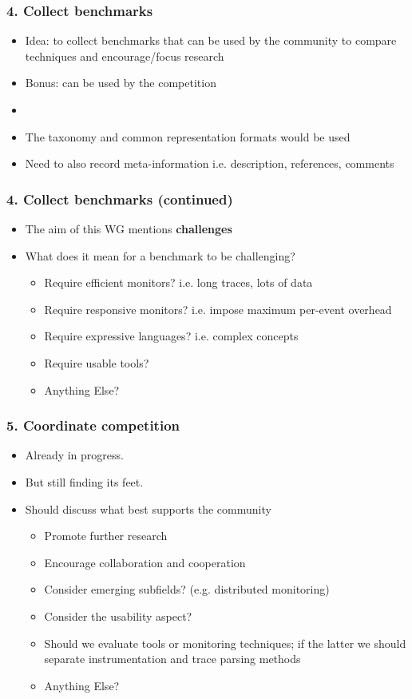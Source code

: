 \documentclass{beamer}
\newcommand{\addhere}{{\color{red} Anything Else?}}
\begin{document}
\begin{frame}
\frametitle{4. Collect benchmarks}
\begin{itemize}
	\item Idea: to collect benchmarks that can be used by the community to compare techniques and encourage/focus research
	\item Bonus: can be used by the competition
	\item[]
	\item The taxonomy and common representation formats would be used
	\item Need to also record meta-information i.e. description, references, comments
\end{itemize}
\end{frame}

\begin{frame}
\frametitle{4. Collect benchmarks (continued)}
\begin{itemize}
	\item The aim of this WG mentions {\bf challenges}
	\item What does it mean for a benchmark to be challenging?
	\begin{itemize}
		\item Require efficient monitors? i.e. long traces, lots of data
		\item Require responsive monitors? i.e. impose maximum per-event overhead
		\item Require expressive languages? i.e. complex concepts
		\item Require usable tools?
		\item \addhere{}
	\end{itemize}
\end{itemize}
\end{frame}

\begin{frame}
\frametitle{5. Coordinate competition}
\begin{itemize}
	\item Already in progress.
	\item But still finding its feet.
	\item Should discuss what best supports the community
	\begin{itemize}
		\item Promote further research
		\item Encourage collaboration and cooperation		
		\item Consider emerging subfields? (e.g. distributed monitoring)
		\item Consider the usability aspect?
		\item Should we evaluate tools or monitoring techniques; if the latter we should separate instrumentation and trace parsing methods
		\item \addhere{}
	\end{itemize}
\end{itemize}
\end{frame}
\end{document}
